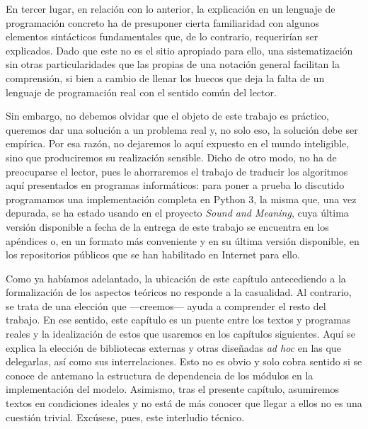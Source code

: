 En tercer lugar, en relación con lo anterior, la explicación en un lenguaje de programación concreto ha de presuponer cierta familiaridad con algunos elementos sintácticos fundamentales que, de lo contrario, requerirían ser explicados. Dado que este no es el sitio apropiado para ello, una sistematización sin otras particularidades que las propias de una notación general facilitan la comprensión, si bien a cambio de llenar los huecos que deja la falta de un lenguaje de programación real con el sentido común del lector.

Sin embargo, no debemos olvidar que el objeto de este trabajo es práctico, queremos dar una solución a un problema real y, no solo eso,  la solución debe ser empírica. Por esa razón, no  dejaremos lo aquí expuesto en el mundo inteligible, sino que produciremos su realización sensible. Dicho de otro modo, no ha de preocuparse el lector, pues le ahorraremos el trabajo de traducir los algoritmos aquí presentados en programas informáticos: para poner a prueba lo discutido programamos una implementación completa en Python 3, la misma que, una vez depurada, se ha estado usando en el proyecto \textit{Sound and Meaning}, cuya última versión disponible a fecha de la entrega de este trabajo se encuentra en los apéndices o, en un formato más conveniente y en su última versión disponible, en los repositorios públicos que se han habilitado en Internet para ello.

Como ya habíamos adelantado, la ubicación de este capítulo antecediendo a la formalización de los aspectos teóricos no responde a la casualidad. Al contrario, se trata de una elección que —creemos— ayuda a comprender el resto del trabajo. En ese sentido, este capítulo es un puente entre los textos y programas reales y la idealización de estos que usaremos en los capítulos siguientes. Aquí se explica  la elección de bibliotecas externas y otras diseñadas \textit{ad hoc} en las que delegarlas, así como sus interrelaciones. Esto no es obvio y solo cobra sentido si se conoce de antemano la estructura de dependencia de los módulos en la implementación del modelo. Asimismo, tras el presente capítulo, asumiremos textos en condiciones ideales y no está de más conocer que llegar a ellos no es una cuestión trivial. Excúsese, pues, este interludio técnico.

